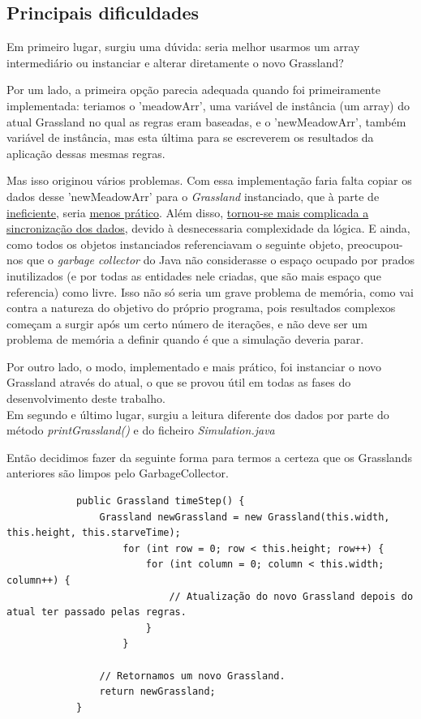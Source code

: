 \documentclass {report}
\begin{document}
	\subsection{Principais dificuldades}
		Em primeiro lugar, surgiu uma dúvida: seria melhor usarmos um array 
		intermediário ou instanciar e alterar diretamente o novo Grassland?

		Por um lado, a primeira opção parecia adequada quando foi primeiramente 
		implementada: teriamos o 'meadowArr', uma variável de instância (um array) 
		do atual Grassland no qual as regras eram baseadas, e o 'newMeadowArr', 
		também variável de instância, mas esta última para se escreverem os resultados 
		da aplicação dessas mesmas regras.

		Mas isso originou vários problemas. Com essa implementação faria falta 
		copiar os dados desse 'newMeadowArr' para o \textit{Grassland} instanciado, 
		que à parte de \underline{ineficiente}, seria \underline{menos prático}. 
		Além disso, \underline{tornou-se mais complicada a sincronização dos dados}, 
		devido à desnecessaria complexidade da lógica. 
		E ainda, como todos os objetos instanciados referenciavam o seguinte objeto, 
		preocupou-nos que o \textit{garbage collector} do Java
		não considerasse o espaço ocupado por prados inutilizados (e por todas as 
		entidades nele criadas, que são mais espaço que referencia) como livre. 
		Isso não só seria um grave problema de memória, como vai contra a natureza do 
		objetivo do próprio programa, pois resultados complexos começam a surgir 
		após um certo número de iterações, e não deve ser um problema de memória a 
		definir quando é que a simulação deveria parar.

		Por outro lado, o modo, implementado e mais prático, foi instanciar o 
		novo Grassland através do atual, 
		o que se provou útil em todas as fases do desenvolvimento deste trabalho.\\

		Em segundo e último lugar, surgiu a leitura diferente dos dados por parte do 
		método \textit{printGrassland()} e do ficheiro \textit{Simulation.java}
		
		Então decidimos fazer da seguinte forma para termos a certeza que os 
		Grasslands anteriores são limpos pelo GarbageCollector.

		\begin{verbatim}
			public Grassland timeStep() {
				Grassland newGrassland = new Grassland(this.width, this.height, this.starveTime);
					for (int row = 0; row < this.height; row++) {
						for (int column = 0; column < this.width; column++) {
							// Atualização do novo Grassland depois do atual ter passado pelas regras.
						}
					}
				 
				// Retornamos um novo Grassland.
				return newGrassland;
			}
		\end{verbatim}
\end{document}
